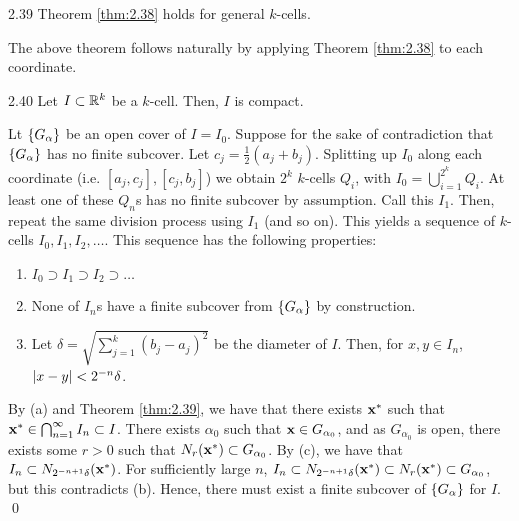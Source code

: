 \begin{theorem}{}{2.39}
    Theorem \ref{thm:2.38} holds for general $k$-cells.
\end{theorem}
\noindent The above theorem follows naturally by applying Theorem \ref{thm:2.38} to each coordinate.

\begin{theorem}{}{2.40}
    Let $I \subset \mathbb{R}^k$ be a $k$-cell. Then, $I$ is compact.
\end{theorem}

\begin{nproof}
    Lt $\set{G_\alpha}$ be an open cover of $I = I_0$. Suppose for the sake of contradiction that $\set{G_\alpha}$ has no finite subcover. Let $c_j = \frac{1}{2}(a_j + b_j)$. Splitting up $I_0$ along each coordinate (i.e. $[a_j, c_j], [c_j, b_j]$) we obtain $2^k$ $k$-cells $Q_i$, with $I_0 = \bigcup_{i=1}^{2^k}Q_i$. At least one of these $Q_n$s has no finite subcover by assumption. Call this $I_1$. Then, repeat the same division process using $I_1$ (and so on). This yields a sequence of $k$-cells $I_0, I_1, I_2, \ldots$. This sequence has the following properties:
    \begin{enumerate}
        \item $I_0 \supset I_1 \supset I_2 \supset \ldots$
        \item None of $I_n$s have a finite subcover from $\set{G_\alpha}$ by construction.
        \item Let $\delta = \sqrt{\sum_{j=1}^k (b_j - a_j)^2}$ be the diameter of $I$. Then, for $x, y \in I_n$, $\abs{x - y} < 2^{-n}\delta$. 
    \end{enumerate}
    By (a) and Theorem \ref{thm:2.39}, we have that there exists $\mathbf{x}^*$ such that $\mathbf{x}^* \in \bigcap_{n=1}^\infty I_n \subset I$. There exists $\alpha_0$ such that $\mathbf{x} \in G_{\alpha_0}$, and as $G_{\alpha_0}$ is open, there exists some $r > 0$ such that $N_r(\mathbf{x}^*) \subset G_{\alpha_0}$. By (c), we have that $I_n \subset N_{2^{-n+1}\delta}(\mathbf{x}^*)$. For sufficiently large $n$, $I_n \subset  N_{2^{-n+1}\delta}(\mathbf{x}^*) \subset N_r(\mathbf{x}^*) \subset G_{\alpha_0}$, but this contradicts (b). Hence, there must exist a finite subcover of $\set{G_\alpha}$ for $I$. \qed
\end{nproof}

